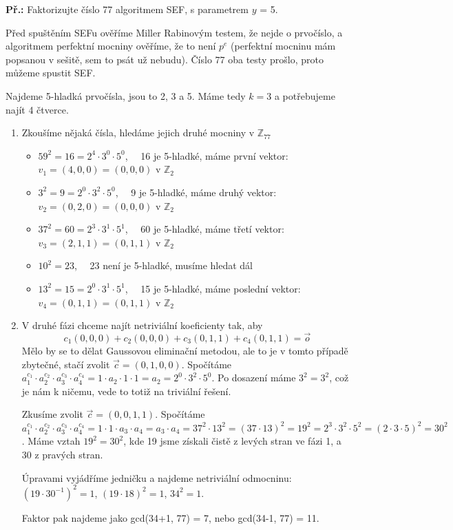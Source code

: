 \begin{exercise}
\textbf{Př.:} Faktorizujte číslo 77 algoritmem SEF, s parametrem $y$ = 5.

Před spuštěním SEFu ověříme Miller Rabinovým testem, že nejde o prvočíslo, a
algoritmem perfektní mocniny ověříme, že to není $p^e$ (perfektní mocninu mám
popsanou v sešitě, sem to psát už nebudu). Číslo 77 oba testy prošlo, proto
můžeme spustit SEF.

Najdeme 5-hladká prvočísla, jsou to 2, 3 a 5. Máme tedy $k = 3$ a potřebujeme
najít 4 čtverce.

\begin{enumerate}
\item Zkoušíme nějaká čísla, hledáme jejich druhé mocniny v $\mathbb{Z}_{77}$
\begin{itemize}
\item $59^2 = 16 = 2^4 \cdot 3^0 \cdot 5^0$, ~~16 je 5-hladké, máme první
vektor: $v_1 = (4, 0, 0) = (0, 0, 0)$ v $\mathbb{Z}_2$
\item $3^2 = 9 = 2^0 \cdot 3^2 \cdot 5^0$, ~~9 je 5-hladké, máme druhý vektor:
$v_2 = (0, 2, 0) = (0, 0, 0)$ v $\mathbb{Z}_2$
\item $37^2 = 60 = 2^3 \cdot 3^1 \cdot 5^1$, ~~60 je 5-hladké, máme třetí
vektor: $v_3 = (2, 1, 1) = (0, 1, 1)$ v $\mathbb{Z}_2$
\item $10^2 = 23$, ~~23 není je 5-hladké, musíme hledat dál
\item $13^2 = 15 = 2^0 \cdot 3^1 \cdot 5^1$, ~~15 je 5-hladké, máme poslední
vektor: $v_4 = (0, 1, 1) = (0, 1, 1)$ v $\mathbb{Z}_2$
\end{itemize}
\item V druhé fázi chceme najít netriviální koeficienty tak, aby
$$c_1(0, 0, 0) + c_2(0, 0, 0) + c_3(0, 1, 1) + c_4(0, 1, 1) = \vec{o}$$ Mělo by
se to dělat Gaussovou eliminační metodou, ale to je v tomto případě zbytečné,
stačí zvolit $\vec{c} = (0, 1, 0, 0)$. Spočítáme $a_1^{c_1} \cdot a_2^{c_2}
\cdot a_3^{c_3} \cdot a_4^{c_4} = 1 \cdot a_2 \cdot 1 \cdot 1 = a_2 = 2^0 \cdot
3^2 \cdot 5^0$. Po dosazení máme $3^2 = 3^2$, což je nám k ničemu, vede to totiž
na triviální řešení.

Zkusíme zvolit  $\vec{c} = (0, 0, 1, 1)$. Spočítáme $a_1^{c_1} \cdot a_2^{c_2}
\cdot a_3^{c_3} \cdot a_4^{c_4} =  1 \cdot 1 \cdot a_3 \cdot a_4 = a_3 \cdot a_4
= 37^2 \cdot 13^2 = (37 \cdot 13)^2 = 19^2 =  2^3 \cdot 3^2 \cdot 5^2 = (2\cdot
3 \cdot 5)^2 = 30^2$. Máme vztah $19^2 = 30^2$, kde 19 jsme získali čistě z
levých stran ve fázi 1, a 30 z pravých stran.

Úpravami vyjádříme jedničku a najdeme netriviální odmocninu: $(19 \cdot
30^{-1})^2 = 1$, $(19 \cdot 18)^2 = 1$, $34^2 = 1$.

Faktor pak najdeme jako gcd(34+1, 77) = 7, nebo gcd(34-1, 77) = 11.
\end{enumerate}
\end{exercise}

